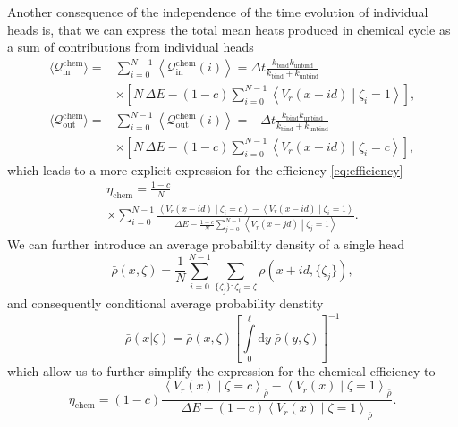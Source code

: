 \documentclass[aps,pre,twocolumn,showpacs,showkeys,superscriptaddress,floatfix]{revtex4-1}
\newcommand{\rmd}{{\mathrm d}}
\begin{document}
Another consequence of the independence of the time evolution of individual heads is, 
that we can express the total mean heats produced in chemical cycle as a sum of contributions from individual heads
\begin{align*}
\langle \mathcal Q_\text{in}^\text{chem} \rangle 
=& \sum\limits_{i=0}^{N-1} \left\langle \mathcal Q_\text{in}^\text{chem}(i) \right\rangle 
= \Delta t \frac{ k_\text{bind} k_\text{unbind} }{ k_\text{bind} + k_\text{unbind} } 
\\ &\times
\left[ N \, \Delta E 
- (1-c) \sum\limits_{i=0}^{N-1} \left\langle V_r(x - i d ) \middle| \zeta_i = 1 \right\rangle 
\right] ,  
\\
\langle \mathcal Q^\text{chem}_\text{out} \rangle 
=& \sum\limits_{i=0}^{N-1} \left\langle \mathcal Q_\text{out}^\text{chem}(i) \right\rangle 
= - \Delta t \frac{ k_\text{bind} k_\text{unbind} }{ k_\text{bind} + k_\text{unbind} } 
\\ &\times
\left[ N \, \Delta E 
- (1-c) \sum\limits_{i=0}^{N-1} \left\langle V_r(x - i d ) \middle| \zeta_i = c \right\rangle  
\right] , 
\end{align*}
which leads to a more explicit expression for the efficiency \eqref{eq:efficiency} 
\begin{multline*}
\eta_\text{chem} = \frac{1-c}{N}
\\ \times
\sum\limits_{i=0}^{N-1} \frac{ \left\langle V_r(x-id) \middle| \zeta_i = c \right\rangle - \left\langle V_r( x -id ) \middle| \zeta_i = 1 \right\rangle }
{ \Delta E - \frac{1-c}{N} \sum\limits_{j=0}^{N-1} \left\langle V_r(x-jd) \middle| \zeta_j = 1 \right\rangle } 
. 
\end{multline*}
We can further introduce an average probability density of a single head 
\begin{equation}
\bar{\rho}(x,\zeta) = \frac{1}{N} \sum\limits_{i=0}^{N-1} \sum\limits_{ \{ \zeta_j \} : \zeta_i = \zeta } \rho( x + i d, \{ \zeta_j \} ) ,
\label{eq:eff_distribution}
\end{equation}
and consequently conditional average probability denstity
\begin{equation}
\bar{\rho}(x|\zeta) = \bar{\rho}(x,\zeta) \left[ \int\limits_0^\ell \rmd y \; \bar{\rho}(y,\zeta) \right]^{-1}
\label{eq:cond_prob}
\end{equation}
which allow us to further simplify the expression for the chemical efficiency to 
\begin{equation}
\eta_\text{chem} = (1-c)
\frac{ \left\langle V_r(x) \middle| \zeta = c \right\rangle_{\bar{\rho}} - \left\langle V_r(x) \middle| \zeta = 1 \right\rangle_{\bar{\rho}} }
{ \Delta E - (1-c) \left\langle V_r(x) \middle| \zeta = 1 \right\rangle_{\bar{\rho}} } 
. 
\label{eq:eta}
\end{equation}
\end{document}

